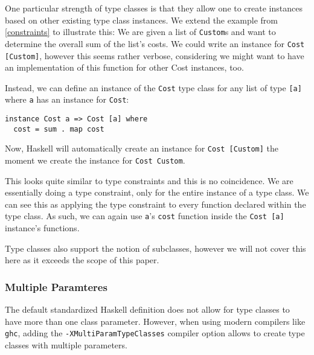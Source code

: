 One particular strength of type classes is that they allow one to create instances based on other existing type class instances. We extend the example from \autoref{constraints} to illustrate this: We are given a list of \verb|Custom|s and want to determine the overall sum of the list's costs. We could write an instance for \verb|Cost [Custom]|, however this seems rather verbose, considering we might want to have an implementation of this function for other Cost instances, too.

Instead, we can define an instance of the \verb|Cost| type class for any list of type \verb|[a]| where \verb|a| has an instance for \verb|Cost|:
\begin{verbatim}
instance Cost a => Cost [a] where
  cost = sum . map cost
\end{verbatim}
Now, Haskell will automatically create an instance for \verb|Cost [Custom]| the moment we create the instance for \verb|Cost Custom|.

This looks quite similar to type constraints and this is no coincidence. We are essentially doing a type constraint, only for the entire instance of a type class. We can see this as applying the type constraint to every function declared within the type class. As such, we can again use \verb|a|'s \verb|cost| function inside the \verb|Cost [a]| instance's functions.


Type classes also support the notion of subclasses, however we will not cover this here as it exceeds the scope of this paper.

\subsubsection{Multiple Paramteres}\label{haskell-add}

The default standardized Haskell definition does not allow for type classes to have more than one class parameter. However, when using modern compilers like \verb|ghc|, adding the \verb|-XMultiParamTypeClasses| compiler option allows to create type classes with multiple parameters.

